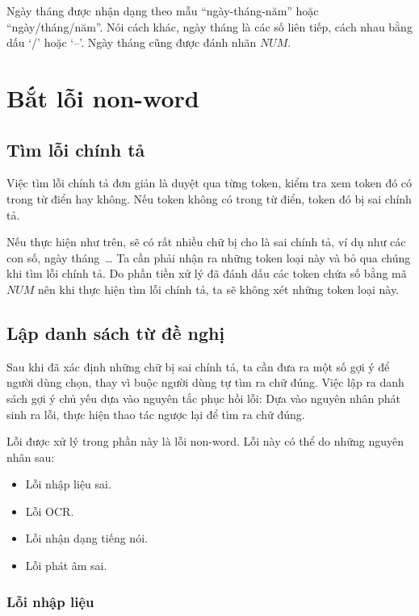 \documentclass[a4paper,oneside,14pt]{extbook} %
\begin{document}
Ngày tháng được nhận dạng theo mẫu ``ngày-tháng-năm'' hoặc
``ngày/tháng/năm''. Nói cách khác, ngày tháng là các số liên tiếp,
cách nhau bằng dấu `/' hoặc `--'. Ngày tháng cũng được đánh nhãn $NUM$.


\section{Bắt lỗi non-word}


\subsection{Tìm lỗi chính tả}
\label{sec:nonword:spelling-checking}

Việc tìm lỗi chính tả đơn giản là duyệt qua từng token, kiểm tra xem
token đó có trong từ điển hay không. Nếu token không có trong từ điển,
token đó bị sai chính tả.

Nếu thực hiện như trên, sẽ có rất nhiều chữ bị cho là sai chính tả, ví
dụ như các con số, ngày tháng~\ldots{} Ta cần phải nhận ra những token
loại này và bỏ qua chúng khi tìm lỗi chính tả. Do phần tiền xử lý đã
đánh dấu các token chứa số bằng mã $NUM$ nên khi thực hiện tìm lỗi
chính tả, ta sẽ không xét những token loại này.


\subsection{Lập danh sách từ đề nghị}
\label{sec:nonword:candidate-list}

Sau khi đã xác định những chữ bị sai chính tả, ta cần đưa ra một số
gợi ý để người dùng chọn, thay vì buộc người dùng tự tìm ra chữ
đúng. Việc lập ra danh sách gợi ý chủ yếu dựa vào nguyên tắc phục hồi
lỗi: Dựa vào nguyên nhân phát sinh ra lỗi, thực hiện thao tác ngược
lại để tìm ra chữ đúng.

Lỗi được xử lý trong phần này là lỗi non-word. Lỗi này có thể do những
nguyên nhân sau:
\begin{itemize}
\item Lỗi nhập liệu sai.
\item Lỗi OCR.
\item Lỗi nhận dạng tiếng nói.
\item Lỗi phát âm sai.
\end{itemize}


\subsubsection{Lỗi nhập liệu}
\label{sec:nonword:recover:keyboard}
\end{document}
